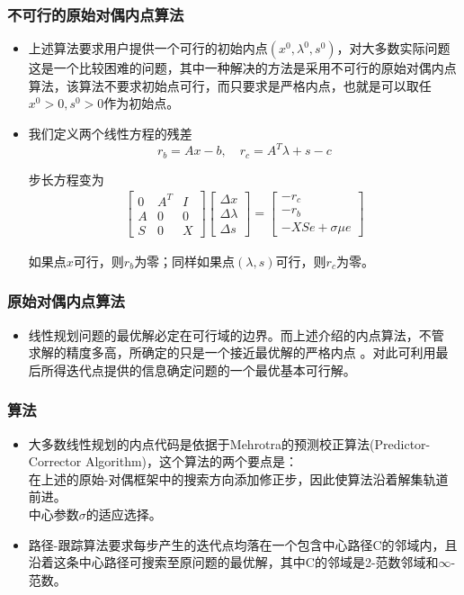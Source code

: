 \documentclass[notheorems,mathserif,table,compress]{beamer}  %
\begin{document}
%
\begin{frame}
\frametitle{不可行的原始对偶内点算法}
\begin{itemize}
\item 上述算法要求用户提供一个可行的初始内点$(x^0, \lambda^0, s^0)$，对大多数实际问题这是一个比较困难的问题，其中一种解决的方法是采用不可行的原始对偶内点算法，该算法不要求初始点可行，而只要求是严格内点，也就是可以取任$x^0>0,s^0>0$作为初始点。
\item  我们定义两个线性方程的残差
\begin{displaymath}
r_b=Ax-b,\quad r_c=A^T\lambda+s-c
\end{displaymath}

步长方程变为
\begin{eqnarray*}
\begin{bmatrix}
0 & A^T & I\\
A & 0 & 0\\
S & 0 & X
\end{bmatrix}
\begin{bmatrix}
\Delta x\\
\Delta \lambda\\
\Delta s
\end{bmatrix}=
\begin{bmatrix}
-r_c\\
-r_b\\
-XSe+\sigma\mu e
\end{bmatrix}
\end{eqnarray*}

如果点$x$可行，则$r_b$为零；同样如果点$(\lambda, s)$可行，则$r_c$为零。 \end{itemize}
\end{frame}

%
\begin{frame}
\frametitle {原始对偶内点算法}
\begin{itemize}
\item 线性规划问题的最优解必定在可行域的边界。而上述介绍的内点算法，不管 求解的精度多高，所确定的只是一个接近最优解的严格内点 。对此可利用最后所得迭代点提供的信息确定问题的一个最优基本可行解。 
\end{itemize}
\end{frame}

%
\begin{frame}
\frametitle {算法}
\begin{itemize}
\item 大多数线性规划的内点代码是依据于Mehrotra的预测校正算法(Predictor-Corrector Algorithm)，这个算法的两个要点是：\\
在上述的原始-对偶框架中的搜索方向添加修正步，因此使算法沿着解集轨道前进。\\
中心参数$\sigma$的适应选择。
\item 路径-跟踪算法要求每步产生的迭代点均落在一个包含中心路径C的邻域内，且沿着这条中心路径可搜索至原问题的最优解，其中C的邻域是2-范数邻域和$\infty$-范数。
\end{itemize}
\end{frame}
\end{document}
